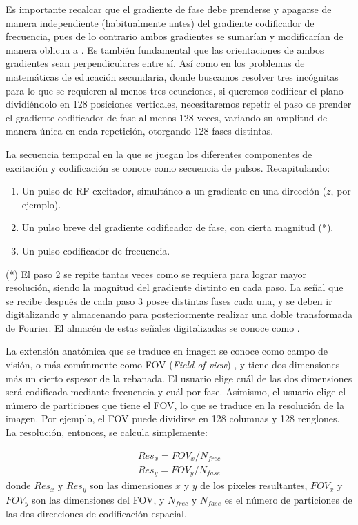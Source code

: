 Es importante recalcar que el gradiente de fase debe prenderse y apagarse de manera independiente (habitualmente antes) del gradiente codificador de frecuencia, pues de lo contrario ambos gradientes se sumarían y modificarían de manera oblicua a \Bzero. Es también fundamental que las orientaciones de ambos gradientes sean perpendiculares entre sí. Así como en los problemas de matemáticas de educación secundaria, donde buscamos resolver tres incógnitas para lo que se requieren al menos tres ecuaciones, si queremos codificar el plano dividiéndolo en 128 posiciones verticales, necesitaremos repetir el paso de prender el gradiente codificador de fase al menos 128 veces, variando su amplitud de manera única en cada repetición, otorgando 128 fases distintas. 

La secuencia temporal en la que se juegan los diferentes componentes de excitación y codificación se conoce como  secuencia de pulsos. Recapitulando:

\begin{enumerate}
 \item Un pulso de RF excitador, simultáneo a un gradiente en una dirección ($z$, por ejemplo).
 \item Un pulso breve del gradiente codificador de fase, con cierta magnitud  (*).
 \item Un pulso codificador de frecuencia.
\end{enumerate}
(*) El paso 2 se repite tantas veces como se requiera para lograr mayor resolución, siendo la magnitud del gradiente distinto en cada paso. La señal que se recibe después de cada paso 3 posee distintas fases cada una, y se deben ir digitalizando y almacenando para posteriormente realizar una doble transformada de Fourier. El almacén de estas señales digitalizadas se conoce como \espaciok.


La extensión anatómica que se traduce en imagen se conoce como campo de visión, o más comúnmente como FOV (\emph{Field of view}) , y tiene dos dimensiones más un cierto espesor de la rebanada. El usuario elige cuál de las dos dimensiones será codificada mediante frecuencia y cuál por fase. Asímismo, el usuario elige el número de particiones que tiene el FOV, lo que se traduce en la resolución de la imagen. Por ejemplo, el FOV puede dividirse en 128 columnas y 128 renglones. La resolución, entonces, se calcula simplemente:

\begin{eqnarray}
 Res_x = FOV_x / N_{frec}\\
 Res_y = FOV_y / N_{fase}
\end{eqnarray}
donde $Res_x$ y $Res_y$ son las dimensiones $x$ y $y$ de los pixeles resultantes, $FOV_x$ y $FOV_y$ son las dimensiones del FOV, y $N_{frec}$ y $N_{fase}$ es el número de particiones de las dos direcciones de codificación espacial. 

